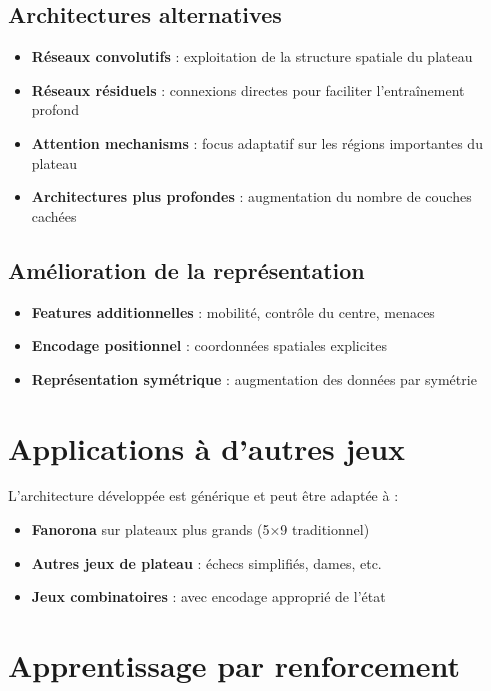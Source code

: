 \documentclass[12pt,a4paper]{report}
\numberwithin{equation}{section}
\begin{document}
\subsection{Architectures alternatives}
\begin{itemize}
  \item \textbf{Réseaux convolutifs} : exploitation de la structure spatiale du plateau
  \item \textbf{Réseaux résiduels} : connexions directes pour faciliter l'entraînement profond
  \item \textbf{Attention mechanisms} : focus adaptatif sur les régions importantes du plateau
  \item \textbf{Architectures plus profondes} : augmentation du nombre de couches cachées
\end{itemize}

\subsection{Amélioration de la représentation}
\begin{itemize}
  \item \textbf{Features additionnelles} : mobilité, contrôle du centre, menaces
  \item \textbf{Encodage positionnel} : coordonnées spatiales explicites
  \item \textbf{Représentation symétrique} : augmentation des données par symétrie
\end{itemize}

\section{Applications à d'autres jeux}

L'architecture développée est générique et peut être adaptée à :
\begin{itemize}
  \item \textbf{Fanorona} sur plateaux plus grands (5×9 traditionnel)
  \item \textbf{Autres jeux de plateau} : échecs simplifiés, dames, etc.
  \item \textbf{Jeux combinatoires} : avec encodage approprié de l'état
\end{itemize}

\section{Apprentissage par renforcement}
\end{document}
